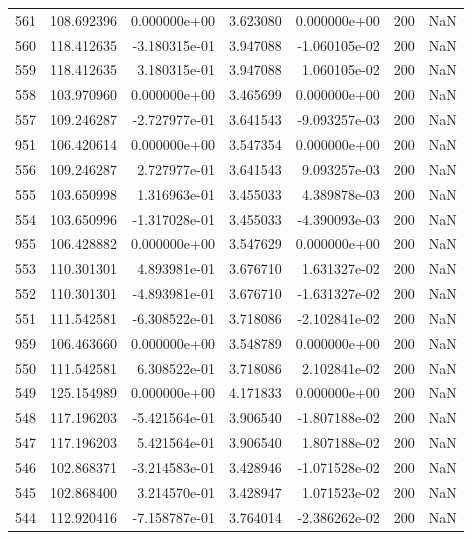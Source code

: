 \begin{tabular}{rrrrrrr}
 561 & 108.692396 &  0.000000e+00 &  3.623080 &  0.000000e+00 &         200 & NaN \\
 560 & 118.412635 & -3.180315e-01 &  3.947088 & -1.060105e-02 &         200 & NaN \\
 559 & 118.412635 &  3.180315e-01 &  3.947088 &  1.060105e-02 &         200 & NaN \\
 558 & 103.970960 &  0.000000e+00 &  3.465699 &  0.000000e+00 &         200 & NaN \\
 557 & 109.246287 & -2.727977e-01 &  3.641543 & -9.093257e-03 &         200 & NaN \\
 951 & 106.420614 &  0.000000e+00 &  3.547354 &  0.000000e+00 &         200 & NaN \\
 556 & 109.246287 &  2.727977e-01 &  3.641543 &  9.093257e-03 &         200 & NaN \\
 555 & 103.650998 &  1.316963e-01 &  3.455033 &  4.389878e-03 &         200 & NaN \\
 554 & 103.650996 & -1.317028e-01 &  3.455033 & -4.390093e-03 &         200 & NaN \\
 955 & 106.428882 &  0.000000e+00 &  3.547629 &  0.000000e+00 &         200 & NaN \\
 553 & 110.301301 &  4.893981e-01 &  3.676710 &  1.631327e-02 &         200 & NaN \\
 552 & 110.301301 & -4.893981e-01 &  3.676710 & -1.631327e-02 &         200 & NaN \\
 551 & 111.542581 & -6.308522e-01 &  3.718086 & -2.102841e-02 &         200 & NaN \\
 959 & 106.463660 &  0.000000e+00 &  3.548789 &  0.000000e+00 &         200 & NaN \\
 550 & 111.542581 &  6.308522e-01 &  3.718086 &  2.102841e-02 &         200 & NaN \\
 549 & 125.154989 &  0.000000e+00 &  4.171833 &  0.000000e+00 &         200 & NaN \\
 548 & 117.196203 & -5.421564e-01 &  3.906540 & -1.807188e-02 &         200 & NaN \\
 547 & 117.196203 &  5.421564e-01 &  3.906540 &  1.807188e-02 &         200 & NaN \\
 546 & 102.868371 & -3.214583e-01 &  3.428946 & -1.071528e-02 &         200 & NaN \\
 545 & 102.868400 &  3.214570e-01 &  3.428947 &  1.071523e-02 &         200 & NaN \\
 544 & 112.920416 & -7.158787e-01 &  3.764014 & -2.386262e-02 &         200 & NaN \\

\end{tabular}
